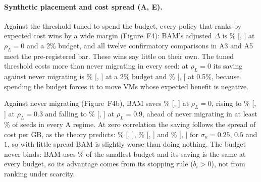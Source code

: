 \paragraph{Synthetic placement and cost spread (A, E).}
Against the threshold tuned to spend the budget, every policy that ranks by expected cost wins
by a wide margin (Figure~F4): BAM's adjusted $\Delta$ is \VDeltaPFourAOneTwo\%
[\VCILoPFourAOneTwo, \VCIHiPFourAOneTwo] at $\rho_L=0$ and a 2\% budget, and all twelve confirmatory comparisons in A3 and A5 meet the pre-registered bar.
These wins say little on their own. The tuned threshold costs more than never migrating in every
seed: at $\rho_L=0$ its saving against never migrating is \VSaveVsPZeroPTwoAOneTwo\%
[\VSaveVsPZeroLoPTwoAOneTwo, \VSaveVsPZeroHiPTwoAOneTwo] at a 2\% budget and
\VSaveVsPZeroPTwoAOneZeroFive\% [\VSaveVsPZeroLoPTwoAOneZeroFive, \VSaveVsPZeroHiPTwoAOneZeroFive]
at 0.5\%, because spending the budget forces it to move VMs whose
expected benefit is negative.

Against never migrating (Figure~F4b), BAM saves \VSaveVsPZeroPFourAOneTwo\% [\VSaveVsPZeroLoPFourAOneTwo,
\VSaveVsPZeroHiPFourAOneTwo] at $\rho_L = 0$, rising to \VSaveVsPZeroPFourAThreeTwo\%
[\VSaveVsPZeroLoPFourAThreeTwo, \VSaveVsPZeroHiPFourAThreeTwo] at $\rho_L = 0.3$ and falling to
\VSaveVsPZeroPFourASevenTwo\% [\VSaveVsPZeroLoPFourASevenTwo, \VSaveVsPZeroHiPFourASevenTwo] at
$\rho_L = 0.9$, ahead of never migrating in at least
\VBeatsPZeroPFourASixTwo\% of seeds in every A regime. At zero correlation the saving follows the spread
of cost per GB, as the theory predicts: \VSaveVsPZeroPFourEOneTwo\%
[\VSaveVsPZeroLoPFourEOneTwo, \VSaveVsPZeroHiPFourEOneTwo], \VSaveVsPZeroPFourETwoTwo\%
[\VSaveVsPZeroLoPFourETwoTwo, \VSaveVsPZeroHiPFourETwoTwo] and \VSaveVsPZeroPFourEThreeTwo\%
[\VSaveVsPZeroLoPFourEThreeTwo, \VSaveVsPZeroHiPFourEThreeTwo] for $\sigma_\kappa = 0.25$, $0.5$
and $1$, so with little spread BAM is
slightly worse than doing nothing. The budget never binds: BAM uses \VUtilPFourAOneZeroFive\% of the
smallest budget and its saving is the same at every budget, so its advantage comes from its
stopping rule ($b_i > 0$), not from ranking under scarcity.

